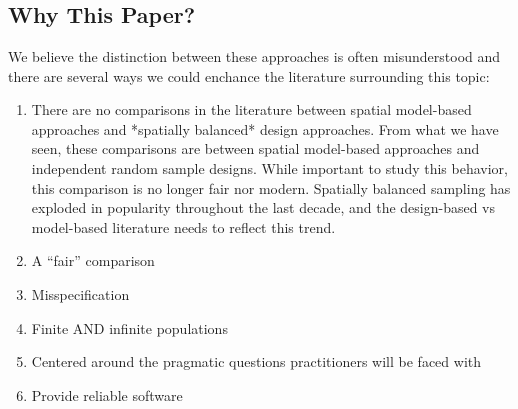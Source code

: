 




\maketitle

\linenumbers

\clearpage

% 

\clearpage

\section*{}

\subsection*{Why This Paper?}

We believe the distinction between these approaches is often misunderstood and there are several ways we could enchance the literature surrounding this topic:

\begin{enumerate}
  \item There are no comparisons in the literature between spatial model-based approaches and *spatially balanced* design approaches. From what we have seen, these comparisons are between spatial model-based approaches and independent random sample designs. While important to study this behavior, this comparison is no longer fair nor modern. Spatially balanced sampling has exploded in popularity throughout the last decade, and the design-based vs model-based literature needs to reflect this trend.
  \item A ``fair'' comparison 
  \item Misspecification
  \item Finite AND infinite populations
  \item Centered around the pragmatic questions practitioners will be faced with
  \item Provide reliable software

\end{enumerate}

